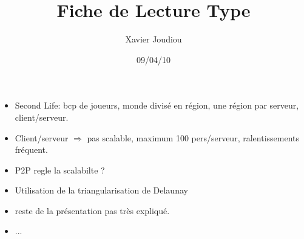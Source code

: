 \documentclass[11pt,a4paper]{article}
\title{Fiche de Lecture Type}
\author{Xavier Joudiou}
\date{09/04/10}
\begin{document}
	
  \begin{itemize}
  \renewcommand{\labelitemi}{$\Rightarrow$}
	\item Second Life: bcp de joueurs, monde divisé en région, une région par serveur, client/serveur.
	\item Client/serveur $\Rightarrow$ pas scalable, maximum 100 pers/serveur, ralentissements fréquent.
	\item P2P regle la scalabilte ?
	\item Utilisation de la triangularisation de Delaunay
	\item reste de la présentation pas très expliqué.
	\item ...
  \end{itemize}
\end{document}
